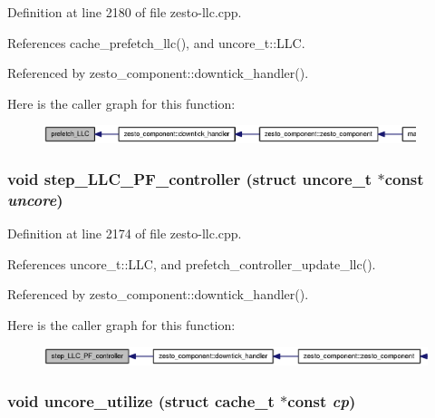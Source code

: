 Definition at line 2180 of file zesto-llc.cpp.

References cache\_\-prefetch\_\-llc(), and uncore\_\-t::LLC.

Referenced by zesto\_\-component::downtick\_\-handler().

Here is the caller graph for this function:\nopagebreak
\begin{figure}[H]
\begin{center}
\leavevmode
\includegraphics[width=308pt]{zesto-llc_8cpp_8ed5f90d7b07bddefbf6736b13da8eb2_icgraph}
\end{center}
\end{figure}
\subsubsection[{step\_\-LLC\_\-PF\_\-controller}]{\setlength{\rightskip}{0pt plus 5cm}void step\_\-LLC\_\-PF\_\-controller (struct {\bf uncore\_\-t} $\ast$const  {\em uncore})}\label{zesto-llc_8cpp_65086cfd5f54ff7a76a41587c8f6a01e}




Definition at line 2174 of file zesto-llc.cpp.

References uncore\_\-t::LLC, and prefetch\_\-controller\_\-update\_\-llc().

Referenced by zesto\_\-component::downtick\_\-handler().

Here is the caller graph for this function:\nopagebreak
\begin{figure}[H]
\begin{center}
\leavevmode
\includegraphics[width=331pt]{zesto-llc_8cpp_65086cfd5f54ff7a76a41587c8f6a01e_icgraph}
\end{center}
\end{figure}
\subsubsection[{uncore\_\-utilize}]{\setlength{\rightskip}{0pt plus 5cm}void uncore\_\-utilize (struct {\bf cache\_\-t} $\ast$const  {\em cp})}\label{zesto-llc_8cpp_d129e662a0b491f13301bf6f96bdcb8b}




